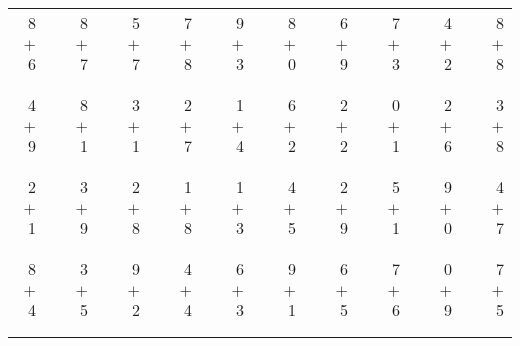\documentclass[12pt, letterpaper]{article}
\begin{document}
\begin{tabular}{rrrrrrrrrrrrrrrrrrr}
8 & & 8 & & 5 & & 7 & & 9 & & 8 & & 6 & & 7 & & 4 & & 8\\
$+$ 6 & & $+$ 7 & & $+$ 7 & & $+$ 8 & & $+$ 3 & & $+$ 0 & & $+$ 9 & & $+$ 3 & & $+$ 2 & & $+$ 8\\
\cline{1-1} \cline{3-3} \cline{5-5} \cline{7-7} \cline{9-9} \cline{11-11} \cline{13-13} \cline{15-15} \cline{17-17} \cline{19-19} \\ \\
4 & & 8 & & 3 & & 2 & & 1 & & 6 & & 2 & & 0 & & 2 & & 3\\
$+$ 9 & & $+$ 1 & & $+$ 1 & & $+$ 7 & & $+$ 4 & & $+$ 2 & & $+$ 2 & & $+$ 1 & & $+$ 6 & & $+$ 8\\
\cline{1-1} \cline{3-3} \cline{5-5} \cline{7-7} \cline{9-9} \cline{11-11} \cline{13-13} \cline{15-15} \cline{17-17} \cline{19-19} \\ \\
2 & & 3 & & 2 & & 1 & & 1 & & 4 & & 2 & & 5 & & 9 & & 4\\
$+$ 1 & & $+$ 9 & & $+$ 8 & & $+$ 8 & & $+$ 3 & & $+$ 5 & & $+$ 9 & & $+$ 1 & & $+$ 0 & & $+$ 7\\
\cline{1-1} \cline{3-3} \cline{5-5} \cline{7-7} \cline{9-9} \cline{11-11} \cline{13-13} \cline{15-15} \cline{17-17} \cline{19-19} \\ \\
8 & & 3 & & 9 & & 4 & & 6 & & 9 & & 6 & & 7 & & 0 & & 7\\
$+$ 4 & & $+$ 5 & & $+$ 2 & & $+$ 4 & & $+$ 3 & & $+$ 1 & & $+$ 5 & & $+$ 6 & & $+$ 9 & & $+$ 5\\
\cline{1-1} \cline{3-3} \cline{5-5} \cline{7-7} \cline{9-9} \cline{11-11} \cline{13-13} \cline{15-15} \cline{17-17} \cline{19-19} \\ \\
\end{tabular}
\newpage
\end{document}
